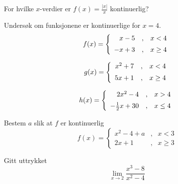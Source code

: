 





\opgt

For hvilke $ x $-verdier er $ f(x)=\frac{|x|}{x} $ kontinuerlig?

Undersøk om funksjonene er kontinuerlige for $ x=4 $.
\begin{equation*}
	f(x)= \left\lbrace{
		\begin{array}{rcr}
			x-5 &,&x<4 \br
			-x+3   &,& x\geq 4
		\end{array}
	}\right. 
\end{equation*}

\begin{equation*}
	g(x)= \left\lbrace{
		\begin{array}{rcr}
			x^2+7 &,&x<4 \br
			5x+1   &,& x\geq 4
		\end{array}
	}\right. 
\end{equation*}

\begin{equation*}
	h(x)= \left\lbrace{
		\begin{array}{rcr}
			2x^2-4 &,&x>4 \br
			-\frac{1}{2}x+30   &,& x\leq 4
		\end{array}
	}\right. 
\end{equation*}

Bestem $ a $ slik at $ f $ er kontinuerlig
\begin{equation*}
	f(x)= \left\lbrace{
		\begin{array}{rcr}
			x^2 - 4 + a &,& x < 3 \\
			2x + 1 & ,& x \geq 3
		\end{array}
	}\right. 
\end{equation*}

\newpage
{}
Gitt uttrykket
\[ \lim\limits_{x\to 2} \frac{x^3-8}{x^2-4} \]

